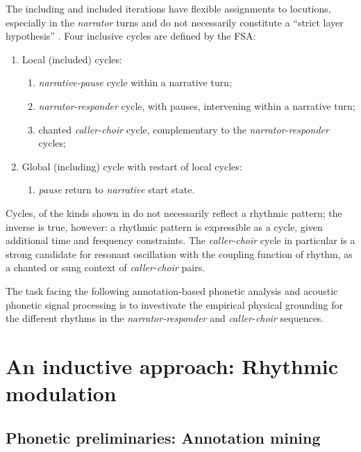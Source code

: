 \documentclass[output=paper,colorlinks,citecolor=brown]{langscibook}
\begin{document}
The including and included iterations have flexible assignments to locutions, especially in the \textit{narrator} turns and do not necessarily constitute a “strict layer hypothesis” \citep{selkirk1984}. Four inclusive cycles are defined by the FSA:

\begin{enumerate} %
\item Local (included) cycles:
	\begin{enumerate} \itemsep -5pt
	\item[] \textit{narrative-pause} cycle within a narrative turn;
	\item[] \textit{narrator-responder} cycle, with pauses, intervening within a narrative turn;
	\item[] chanted \textit{caller-choir} cycle, complementary to the \textit{narrator-responder} cycles;
	\end{enumerate}
\item Global (including) cycle with restart of local cycles:
	\begin{enumerate} %
	\item[] \textit{pause} return to \textit{narrative} start state.
	\end{enumerate}
\end{enumerate}

Cycles, of the kinds shown in  do not necessarily reflect a rhythmic pattern; the inverse is true, however: a rhythmic pattern is expressible as a cycle, given additional time and frequency constraints. The \textit{caller-choir} cycle in particular is a strong candidate for resonant oscillation with the coupling function of rhythm, as a chanted or sung context of \textit{caller-choir} pairs.

The task facing the following annotation-based phonetic analysis and acoustic phonetic signal processing is to investivate the empirical physical grounding for the different rhythms in the \textit{narrator-responder} and \textit{caller-choir} sequences.


\section{An inductive approach: Rhythmic modulation}\label{sec:gibbon:3}

\subsection{Phonetic preliminaries: Annotation mining}
\end{document}
